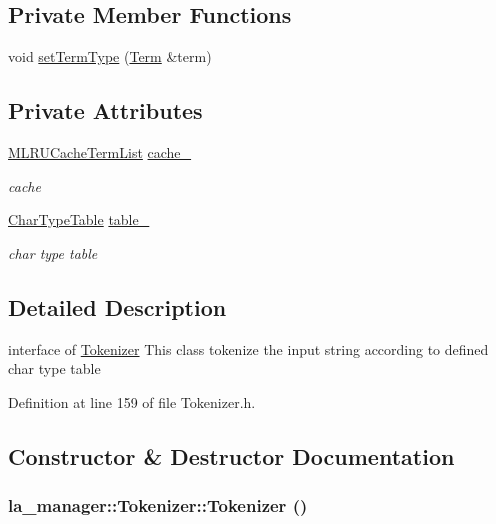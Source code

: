 \subsection*{Private Member Functions}
\begin{CompactItemize}
\item 
void \hyperlink{classla__manager_1_1Tokenizer_fa10acb0f5ca1e0227d88a159d790bd7}{setTermType} (\hyperlink{classla__manager_1_1Term}{Term} \&term)
\end{CompactItemize}
\subsection*{Private Attributes}
\begin{CompactItemize}
\item 
\hyperlink{namespacela__manager_2ae131a60e2247f3f26c245dac7d0c56}{MLRUCacheTermList} \hyperlink{classla__manager_1_1Tokenizer_f1f7c6216c8af54190627b27d2090e48}{cache\_\-}
\begin{CompactList}\small\item\em cache \item\end{CompactList}\item 
\hyperlink{classla__manager_1_1CharTypeTable}{CharTypeTable} \hyperlink{classla__manager_1_1Tokenizer_6f4cf5fcbd2505e9258f9e570b7e4ce0}{table\_\-}
\begin{CompactList}\small\item\em char type table \item\end{CompactList}\end{CompactItemize}


\subsection{Detailed Description}
interface of \hyperlink{classla__manager_1_1Tokenizer}{Tokenizer} This class tokenize the input string according to defined char type table 

Definition at line 159 of file Tokenizer.h.

\subsection{Constructor \& Destructor Documentation}
\hypertarget{classla__manager_1_1Tokenizer_6051a46c915e82456a0a228acffb20d0}{
\subsubsection[{Tokenizer}]{\setlength{\rightskip}{0pt plus 5cm}la\_\-manager::Tokenizer::Tokenizer ()}}
\label{classla__manager_1_1Tokenizer_6051a46c915e82456a0a228acffb20d0}




